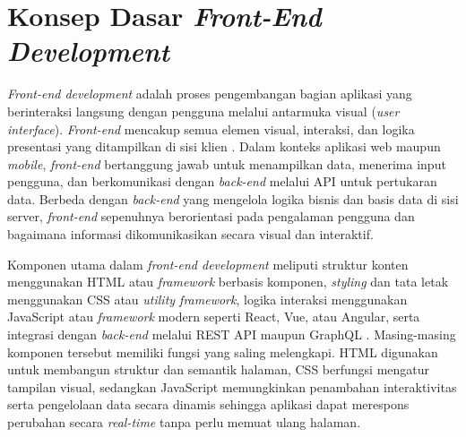 

\section{Konsep Dasar \textit{Front-End Development}}
\textit{Front-end development} adalah proses pengembangan bagian aplikasi yang berinteraksi langsung dengan pengguna melalui antarmuka visual (\textit{user interface}). \textit{Front-end} mencakup semua elemen visual, interaksi, dan logika presentasi yang ditampilkan di sisi klien \cite{bollini2017beautiful}. Dalam konteks aplikasi web maupun \textit{mobile}, \textit{front-end} bertanggung jawab untuk menampilkan data, menerima input pengguna, dan berkomunikasi dengan \textit{back-end} melalui API untuk pertukaran data. Berbeda dengan \textit{back-end} yang mengelola logika bisnis dan basis data di sisi server, \textit{front-end} sepenuhnya berorientasi pada pengalaman pengguna dan bagaimana informasi dikomunikasikan secara visual dan interaktif.

Komponen utama dalam \textit{front-end development} meliputi struktur konten menggunakan HTML atau \textit{framework} berbasis komponen, \textit{styling} dan tata letak menggunakan CSS atau \textit{utility framework}, logika interaksi menggunakan JavaScript atau \textit{framework} modern seperti React, Vue, atau Angular, serta integrasi dengan \textit{back-end} melalui REST API maupun GraphQL \cite{osmani2023learning}. Masing-masing komponen tersebut memiliki fungsi yang saling melengkapi. HTML digunakan untuk membangun struktur dan semantik halaman, CSS berfungsi mengatur tampilan visual, sedangkan JavaScript memungkinkan penambahan interaktivitas serta pengelolaan data secara dinamis sehingga aplikasi dapat merespons perubahan secara \textit{real-time} tanpa perlu memuat ulang halaman.

